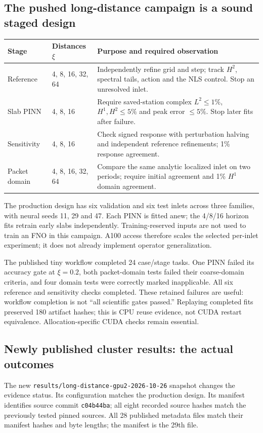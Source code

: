 \documentclass[11pt]{article}
\begin{document}
\subsection{The pushed long-distance campaign is a sound staged design}
\begin{center}\small
\begin{tabular}{p{}p{}p{}}\toprule
Stage & Distances $\xi$ & Purpose and required observation\\\midrule
Reference & 4, 8, 16, 32, 64 & Independently refine grid and step; track $H^2$,
spectral tails, action and the NLS control. Stop an unresolved inlet.\\
Slab PINN & 4, 8, 16 & Require saved-station complex $L^2\leq1\%$, $H^1,H^2\leq5\%$
and peak error $\leq5\%$. Stop later fits after failure.\\
Sensitivity & 4, 8, 16 & Check signed response with perturbation halving and
independent reference refinements; 1\% response agreement.\\
Packet domain & 4, 8, 16, 32, 64 & Compare the same analytic localized inlet on
two periods; require initial agreement and 1\% $H^1$ domain agreement.\\\bottomrule
\end{tabular}
\end{center}
The production design has six validation and six test inlets across three
families, with neural seeds 11, 29 and 47. Each PINN is fitted anew; the
4/8/16 horizon fits retrain early slabs independently. Training-reserved inputs
are not used to train an FNO in this campaign. A100 access therefore scales the
selected per-inlet experiment; it does not already implement operator generalization.

The published tiny workflow completed 24 case/stage tasks. One PINN failed its
accuracy gate at $\xi=0.2$, both packet-domain tests failed their coarse-domain
criteria, and four domain tests were correctly marked inapplicable. All six
reference and sensitivity checks completed. These retained failures are useful:
workflow completion is not ``all scientific gates passed.'' Replaying completed
fits preserved 180 artifact hashes; this is CPU reuse evidence, not CUDA restart
equivalence. Allocation-specific CUDA checks remain essential.

\newpage
\subsection{Newly published cluster results: the actual outcomes}\label{sec:gpu}
The new \texttt{results/long-distance-gpu2-2026-10-26} snapshot changes the
evidence status. Its configuration matches the production design. Its manifest
identifies source commit \texttt{c04b44ba}; all eight recorded source hashes
match the previously tested pinned sources. All 28 published metadata files
match their manifest hashes and byte lengths; the manifest is the 29th file.
\end{document}
